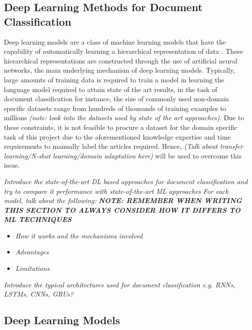 \documentclass[a4paper,twoside,phd]{BYUPhys}
\begin{document}
\subsection{Deep Learning Methods for Document Classification}
\label{sec:DLDocumentClassification}

Deep learning models are a class of machine learning models that have the capability of automatically learning a hierarchical representation of data \cite{Basheer2000}. These hierarchical representations are constructed through the use of artificial neural networks, the main underlying mechanism of deep learning models. Typically, large amounts of training data is required to train a model in learning the language model required to attain state of the art results, in the task of document classification for instance, the size of commonly used non-domain specific datasets range from hundreds of thousands of training examples to millions \cite{Conneau2017} \cite{Zhang} \textit{(note: look into the datasets used by state of the art approaches)}. Due to these constraints, it is not feasible to procure a dataset for the domain specific task of this project due to the aforementioned knowledge expertise and time requirements to manually label the articles required. Hence, \textit{(Talk about transfer learning/N-shot learning/domain adaptation here)} will be used to overcome this issue.

\textit{Introduce the state-of-the-art DL based approaches for document classification and try to compare it performance with state-of-the-art ML approaches} \newline
\textit{For each model, talk about the following:}
\newline
\textbf{\textit{NOTE: REMEMBER WHEN WRITING THIS SECTION TO ALWAYS CONSIDER HOW IT DIFFERS TO ML TECHNIQUES}}
\begin{itemize}
	\item \textit{How it works and the mechanisms involved}
	\item \textit{Advantages}
	\item \textit{Limitations}
\end{itemize} 

\textit{Introduce the typical architectures used for document classification e.g. RNNs, LSTMs, CNNs, GRUs?}

\subsection{Deep Learning Models}
\label{sec:DLModels}
\end{document}
